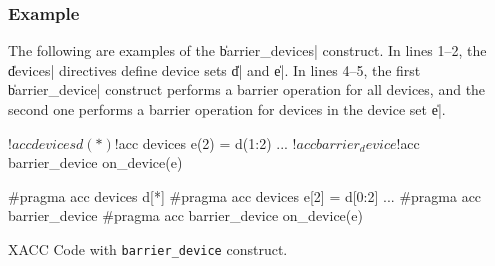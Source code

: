 \subsubsection*{Example}

The following are examples of the \|barrier_devices| construct.
In lines 1--2, the \|devices| directives define device sets \|d| and
\|e|.
In lines 4--5, the first \|barrier_device| construct performs a
barrier operation for all devices, 
and the second one performs a barrier operation for devices in the
device set \|e|.
%
\begin{myfigure}
\begin{minipage}{0.455\hsize}
\begin{center}
\begin{XACCFexampleL}
!$acc devices d(*)
!$acc devices e(2) = d(1:2)
...  
!$acc barrier_device
!$acc barrier_device on_device(e)  
\end{XACCFexampleL}
\end{center}
\end{minipage}
%
\begin{minipage}{0.535\hsize}
\begin{center}
\begin{XACCCexampleR}
#pragma acc devices d[*]
#pragma acc devices e[2] = d[0:2]
...
#pragma acc barrier_device
#pragma acc barrier_device on_device(e)
\end{XACCCexampleR}
\end{center}
\end{minipage}
\caption{XACC Code with {\tt barrier\_device}
  construct.}\label{code:barrier_device}
\end{myfigure}
